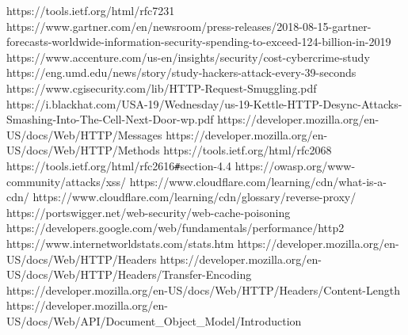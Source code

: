 \documentclass[
fontsize=11pt,
paper=a4,
abstract=true,
numbers=noenddot,
listof=totoc,
bibliography=totoc,
oneside,
cleardoublepage=plain,
parskip=half+, %
BCOR=1cm, %
]{scrreprt}
\begin{document}
















\begin{thebibliography}{00}
	 https://tools.ietf.org/html/rfc7231 
	 https://www.gartner.com/en/newsroom/press-releases/2018-08-15-gartner-forecasts-worldwide-information-security-spending-to-exceed-124-billion-in-2019
	 https://www.accenture.com/us-en/insights/security/cost-cybercrime-study
	 https://eng.umd.edu/news/story/study-hackers-attack-every-39-seconds
	 https://www.cgisecurity.com/lib/HTTP-Request-Smuggling.pdf
	 https://i.blackhat.com/USA-19/Wednesday/us-19-Kettle-HTTP-Desync-Attacks-Smashing-Into-The-Cell-Next-Door-wp.pdf
	 https://developer.mozilla.org/en-US/docs/Web/HTTP/Messages
	 https://developer.mozilla.org/en-US/docs/Web/HTTP/Methods
	 https://tools.ietf.org/html/rfc2068
	 https://tools.ietf.org/html/rfc2616\verb|#|section-4.4
	 https://owasp.org/www-community/attacks/xss/
	 https://www.cloudflare.com/learning/cdn/what-is-a-cdn/
	 https://www.cloudflare.com/learning/cdn/glossary/reverse-proxy/
	 https://portswigger.net/web-security/web-cache-poisoning
	 https://developers.google.com/web/fundamentals/performance/http2
	 https://www.internetworldstats.com/stats.htm
	 https://developer.mozilla.org/en-US/docs/Web/HTTP/Headers
	 https://developer.mozilla.org/en-US/docs/Web/HTTP/Headers/Transfer-Encoding
	 https://developer.mozilla.org/en-US/docs/Web/HTTP/Headers/Content-Length
	https://developer.mozilla.org/en-US/docs/Web/API/Document_Object_Model/Introduction
	
\end{thebibliography}	
\end{document}
